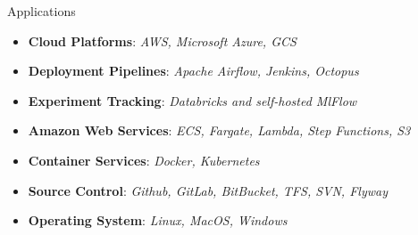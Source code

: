 \Technology
{Applications}
{\faLinux}
{\begin{itemize}
    \item \textbf{Cloud Platforms}:
      \emph{AWS, Microsoft Azure, GCS}
    \item \textbf{Deployment Pipelines}:
    \emph{Apache Airflow, Jenkins, Octopus}
    \item \textbf{Experiment Tracking}:
      \emph{Databricks and self-hosted MlFlow}
    \item \textbf{Amazon Web Services}:
      \emph{ECS, Fargate, Lambda, Step Functions, S3}
    \item \textbf{Container Services}:
      \emph{Docker, Kubernetes}
    \item \textbf{Source Control}:
      \emph{Github, GitLab, BitBucket, TFS, SVN, Flyway}
    \item \textbf{Operating System}:
      \emph{Linux, MacOS, Windows}
\end{itemize}}